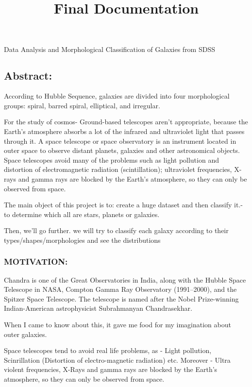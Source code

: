 \documentclass[11pt]{article}
\title{Final Documentation}
\begin{document}
    
    
    \maketitle
    
    

    
    Data Analysis and Morphological Classification of Galaxies from SDSS

    \subsection{Abstract:}\label{abstract}

According to Hubble Sequence, galaxies are divided into four
morphological groups: spiral, barred spiral, elliptical, and irregular.

For the study of cosmos- Ground-based telescopes aren't appropriate,
because the Earth's atmosphere absorbs a lot of the infrared and
ultraviolet light that passes through it. A space telescope or space
observatory is an instrument located in outer space to observe distant
planets, galaxies and other astronomical objects. Space telescopes avoid
many of the problems such as light pollution and distortion of
electromagnetic radiation (scintillation); ultraviolet frequencies,
X-rays and gamma rays are blocked by the Earth's atmosphere, so they can
only be observed from space.

The main object of this project is to: create a huge dataset and then
classify it.- to determine which all are stars, planets or galaxies.

Then, we'll go further. we will try to classify each galaxy according to
their types/shapes/morphologies and see the distributions

    \subsubsection{MOTIVATION:}\label{motivation}

Chandra is one of the Great Observatories in India, along with the
Hubble Space Telescope in NASA, Compton Gamma Ray Observatory
(1991--2000), and the Spitzer Space Telescope. The telescope is named
after the Nobel Prize-winning Indian-American astrophysicist
Subrahmanyan Chandrasekhar.

When I came to know about this, it gave me food for my imagination about
outer galaxies.

Space telescopes tend to avoid real life problems, as - Light pollution,
Scinrillation (Distortion of electro-magnetic radiation) etc. Moreover -
Ultra violent frequencies, X-Rays and gamma rays are blocked by the
Earth's atmosphere, so they can only be observed from space.
\end{document}
